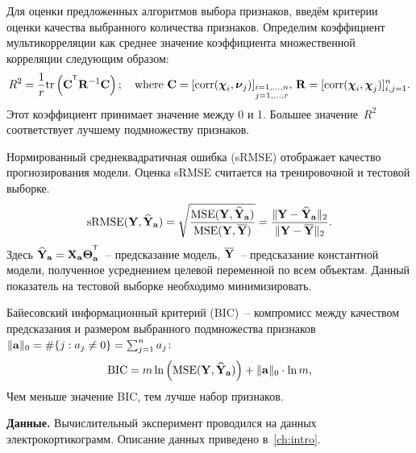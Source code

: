 Для оценки предложенных алгоритмов выбора признаков, введём критерии оценки качества выбранного количества признаков.
Определим коэффициент мультикорреляции как среднее значение коэффициента множественной корреляции следующим образом:
\begin{equation*}
R^2 = \frac{1}{r} \text{tr} \left( \bC^{\T} \mathbf{R}^{-1} \bC \right); \quad \text{where }\bC = [ \text{corr}(\bchi_i, \bnu_j)]_{\substack{i=1, \dots, n \\ j=1, \dots, r}}, \, \mathbf{R} = [ \text{corr}(\bchi_i, \bchi_j)]_{i, j = 1}^n.
\end{equation*}
Этот коэффициент принимает значение между 0 и 1. Большее значение~$R^2$ соответствует лучшему подмножеству признаков.

Нормированный среднеквадратичная ошибка (sRMSE) отображает качество прогнозирования модели. Оценка sRMSE считается на тренировочной и тестовой выборке.
\begin{equation*}
\text{sRMSE}(\mathbf{Y}, \widehat{\mathbf{Y}}_{\mathbf{a}}) = \sqrt{\frac{\text{MSE} (\mathbf{Y}, \widehat{\mathbf{Y}}_{\mathbf{a}})}{\text{MSE} (\mathbf{Y}, \overline{\mathbf{Y}})}} =  \frac{\| \mathbf{Y} - \widehat{\mathbf{Y}}_{\mathbf{a}} \|_2}{\| \mathbf{Y} - \overline{\mathbf{Y}} \|_2}.
\end{equation*}
Здесь $\widehat{\bY}_{\ba} = \bX_{\ba} \bTheta_{\ba}^{\T}$~-- предсказание модель, $\overline{\mathbf{Y}}$~-- предсказание константной модели, полученное усреднением целевой переменной по всем объектам.
Данный показатель на тестовой выборке необходимо минимизировать.

Байесовский информационный критерий (BIC)~-- компромисс между качеством предсказания и размером выбранного подмножества признаков~$\|\mathbf{a}\|_0 = \#\{j: a_j \neq 0\}= \sum_{j=1}^n a_j$:
\begin{equation*}
\text{BIC} = m \ln \left( \text{MSE} ( \mathbf{Y}, \widehat{\mathbf{Y}}_{\mathbf{a}})\right) + \| \mathbf{a} \|_0 \cdot \ln m,
\end{equation*}
Чем меньше значение BIC, тем лучше набор признаков.

\textbf{Данные.}
Вычислительный эксперимент проводился на данных электрокортикограмм. Описание данных приведено в~\autoref{ch:intro}.

